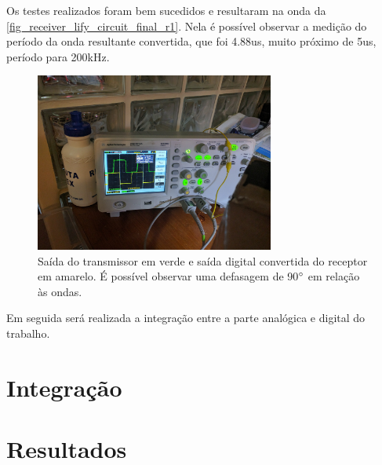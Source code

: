 	Os testes realizados foram bem sucedidos e resultaram na onda da \autoref{fig_receiver_lify_circuit_final_r1}. Nela é possível observar a medição do período da onda resultante convertida, que foi 4.88us, muito próximo de 5us, período para 200kHz.
	
	\begin{figure}[htb]
		\caption{\label{fig_receiver_lify_circuit_final_r1}Saída do transmissor em verde e saída digital convertida do receptor em amarelo. É possível observar uma defasagem de 90$\degree$ em relação às ondas.}
		\centering
		\includegraphics[width=0.7\textwidth, trim={36cm 30cm 60cm 40cm}, clip]{circuits/photos/TXRX_final_fixed.jpg}
	\end{figure}
	
	Em seguida será realizada a integração entre a parte analógica e digital do trabalho.

	\section{Integração}
	
	\section{Resultados}
	
	